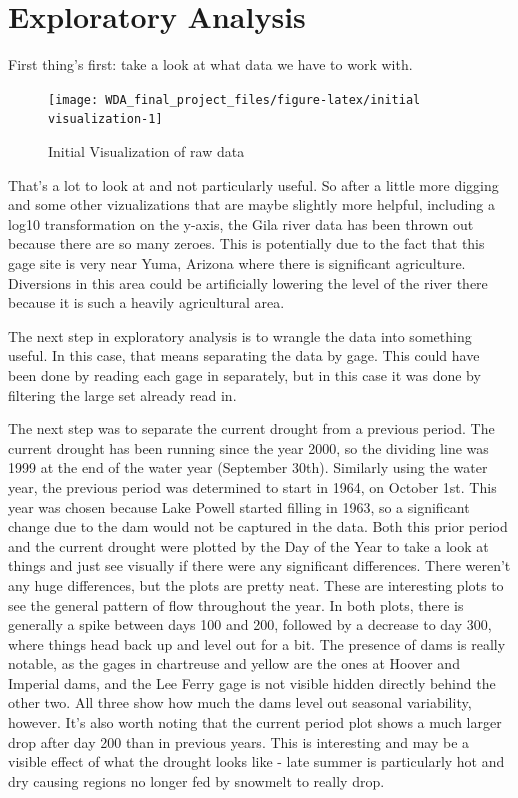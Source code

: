 \documentclass[
  12pt,
]{article}
\begin{document}
\hypertarget{exploratory-analysis}{%
\section{Exploratory Analysis}\label{exploratory-analysis}}

First thing's first: take a look at what data we have to work with.

\begin{figure}

\texttt{[image: WDA\_final\_project\_files/figure-latex/initial visualization-1]} \hfill{}

\caption{Initial Visualization of raw data}\label{fig:initial visualization}
\end{figure}

That's a lot to look at and not particularly useful. So after a little
more digging and some other vizualizations that are maybe slightly more
helpful, including a log10 transformation on the y-axis, the Gila river
data has been thrown out because there are so many zeroes. This is
potentially due to the fact that this gage site is very near Yuma,
Arizona where there is significant agriculture. Diversions in this area
could be artificially lowering the level of the river there because it
is such a heavily agricultural area.

The next step in exploratory analysis is to wrangle the data into
something useful. In this case, that means separating the data by gage.
This could have been done by reading each gage in separately, but in
this case it was done by filtering the large set already read in.

The next step was to separate the current drought from a previous
period. The current drought has been running since the year 2000, so the
dividing line was 1999 at the end of the water year (September 30th).
Similarly using the water year, the previous period was determined to
start in 1964, on October 1st. This year was chosen because Lake Powell
started filling in 1963, so a significant change due to the dam would
not be captured in the data. Both this prior period and the current
drought were plotted by the Day of the Year to take a look at things and
just see visually if there were any significant differences. There
weren't any huge differences, but the plots are pretty neat. These are
interesting plots to see the general pattern of flow throughout the
year. In both plots, there is generally a spike between days 100 and
200, followed by a decrease to day 300, where things head back up and
level out for a bit. The presence of dams is really notable, as the
gages in chartreuse and yellow are the ones at Hoover and Imperial dams,
and the Lee Ferry gage is not visible hidden directly behind the other
two. All three show how much the dams level out seasonal variability,
however. It's also worth noting that the current period plot shows a
much larger drop after day 200 than in previous years. This is
interesting and may be a visible effect of what the drought looks like -
late summer is particularly hot and dry causing regions no longer fed by
snowmelt to really drop.
\end{document}
